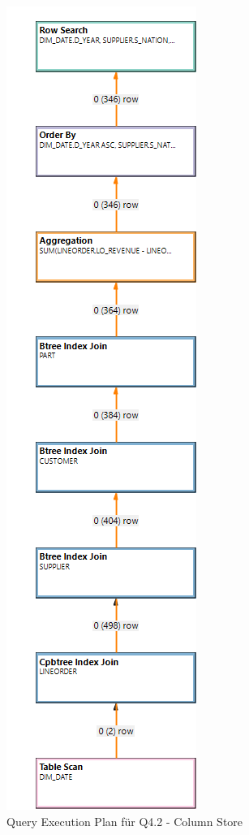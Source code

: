 \begin{figure}[H]

	\centering
	\includegraphics[scale=0.4]{images/q42row}
	\caption{Query Execution Plan für Q4.2 - Column Store 	\label{qepRow} }
\end{figure}



